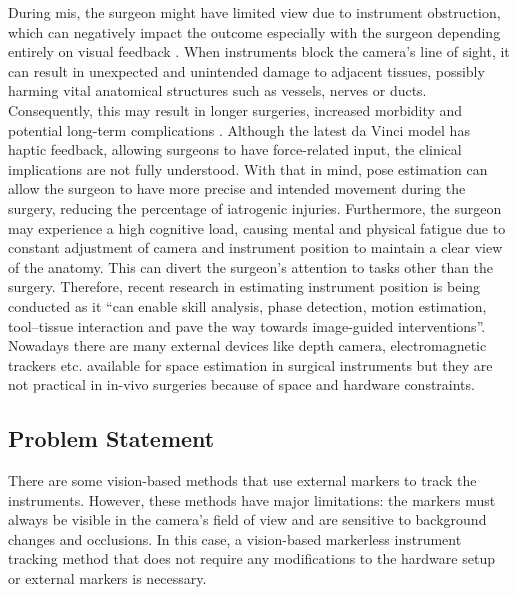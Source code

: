 \documentclass[12pt]{article}
\begin{document}
During \gls{mis}, the surgeon might have limited view due to instrument obstruction, which can negatively impact the outcome especially with the surgeon depending entirely on visual feedback \cite{kassahun2016surgical}. When instruments block the camera's line of sight, it can result in unexpected and unintended damage to adjacent tissues, possibly harming vital anatomical structures such as vessels, nerves or ducts. Consequently, this may result in longer surgeries, increased morbidity and potential long-term complications\cite{allan2017visual} \cite{allan20183}. Although the latest da Vinci model has haptic feedback, allowing surgeons to have force-related input\cite{saracino2019haptic}, the clinical implications are not fully understood. With that in mind, pose estimation can allow the surgeon to have more precise and intended movement during the surgery, reducing the percentage of iatrogenic injuries\cite{allan2017visual}\cite{hein2021towards}. Furthermore, the surgeon may experience a high cognitive load, causing mental and physical fatigue due to constant adjustment of camera and instrument position to maintain a clear view of the anatomy\cite{allan20183}\cite{allan2017visual}\cite{shugaba2022should}. This can divert the surgeon's attention to tasks other than the surgery. Therefore, recent research in estimating instrument position is being conducted as it “can enable skill analysis, phase detection, motion estimation, tool–tissue interaction and pave the way towards image-guided interventions”\cite{hein2021towards}. Nowadays there are many external devices like depth camera, electromagnetic trackers etc. available for space estimation in surgical instruments but they are not practical in in-vivo surgeries because of space and hardware constraints\cite{enhancedmarker}.

\subsection{Problem Statement}
There are some vision-based methods that use external markers to track the instruments. However, these methods have major limitations: the markers must always be visible in the camera's field of view and are sensitive to background changes and occlusions\cite{10160287}. In this case, a vision-based markerless instrument tracking method that does not require any modifications to the hardware setup or external markers is necessary. 
\end{document}
